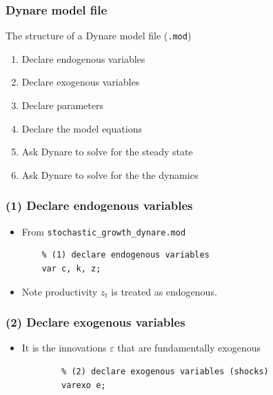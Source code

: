 \documentclass{beamer}
\begin{document}
\begin{frame}
\frametitle{Dynare model file}

The structure of a Dynare model file (\texttt{.mod})
\begin{enumerate}
	\item Declare endogenous variables
	\item Declare exogenous variables
	\item Declare parameters
	\item Declare the model equations
	\item Ask Dynare to solve for the steady state
	\item Ask Dynare to solve for the the dynamics
\end{enumerate}
\end{frame}

\begin{frame}[fragile]
\frametitle{(1) Declare endogenous variables}
\begin{itemize}
	\item From \texttt{stochastic\_growth\_dynare.mod}
	
	\begin{verbatim}
	% (1) declare endogenous variables
	var c, k, z;
	\end{verbatim}
	\item Note productivity $ z_{t} $ is treated as endogenous.
\end{itemize}

\end{frame}

\begin{frame}[fragile]
\frametitle{(2) Declare exogenous variables}
\begin{itemize}
	\item It is the innovations $ \varepsilon $ that are fundamentally exogenous
	
	\begin{verbatim}
		% (2) declare exogenous variables (shocks)
		varexo e;
	\end{verbatim}
	
\end{itemize}
\end{frame}
\end{document}
